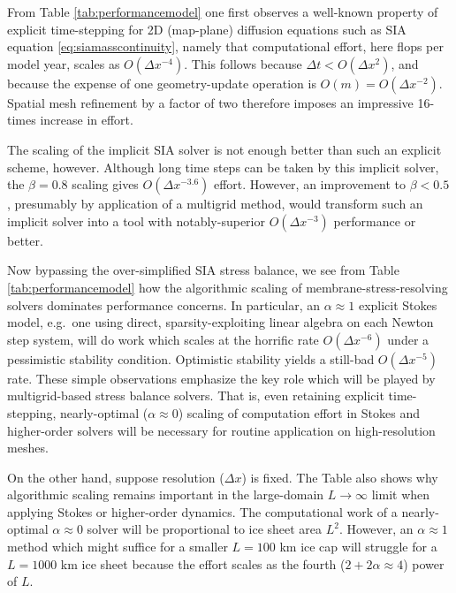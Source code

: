\documentclass[review]{igs}
\begin{document}
From Table \ref{tab:performancemodel} one first observes a well-known property of explicit time-stepping for 2D (map-plane) diffusion equations such as SIA equation \eqref{eq:siamasscontinuity}, namely that computational effort, here flops per model year, scales as $O(\Delta x^{-4})$.  This follows because $\Delta t < O(\Delta x^2)$, and because the expense of one geometry-update operation is $O(m) = O(\Delta x^{-2})$.  Spatial mesh refinement by a factor of two therefore imposes an impressive 16-times increase in effort.

The scaling of the \cite{Bueler2016} implicit SIA solver is not enough better than such an explicit scheme, however.  Although long time steps can be taken by this implicit solver, the $\beta=0.8$ scaling gives $O(\Delta x^{-3.6})$ effort.  However, an improvement to $\beta < 0.5$, presumably by application of a multigrid method, would transform such an implicit solver into a tool with notably-superior $O(\Delta x^{-3})$ performance or better.

Now bypassing the over-simplified SIA stress balance, we see from Table \ref{tab:performancemodel} how the algorithmic scaling of membrane-stress-resolving solvers dominates performance concerns.  In particular, an $\alpha \approx 1$ explicit Stokes model, e.g.~one using direct, sparsity-exploiting linear algebra on each Newton step system, will do work which scales at the horrific rate $O(\Delta x^{-6})$ under a pessimistic stability condition.  Optimistic stability yields a still-bad $O(\Delta x^{-5})$ rate.  These simple observations emphasize the key role which will be played by multigrid-based stress balance solvers.  That is, even retaining explicit time-stepping, nearly-optimal ($\alpha \approx 0$) scaling of computation effort in Stokes and higher-order solvers will be necessary for routine application on high-resolution meshes.

On the other hand, suppose resolution ($\Delta x$) is fixed.  The Table also shows why algorithmic scaling remains important in the large-domain $L\to\infty$ limit when applying Stokes or higher-order dynamics.  The computational work of a nearly-optimal $\alpha \approx 0$ solver will be proportional to ice sheet area $L^2$.  However, an $\alpha \approx 1$ method which might suffice for a smaller $L=100$ km ice cap will struggle for a $L=1000$ km ice sheet because the effort scales as the fourth ($2+2\alpha \approx 4$) power of $L$.
\end{document}
